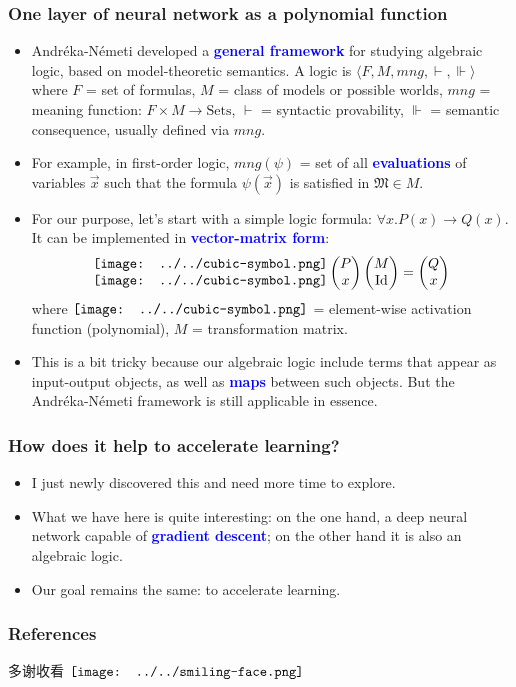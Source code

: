 \documentclass[16pt]{beamer}
\newcommand{\cc}[2]{#1}
\newcommand{\cc}[2]{#2}
\let\oldtextbf\textbf
\renewcommand{\textbf}[1]{\textcolor{blue}{\oldtextbf{#1}}}
\newcommand{\smiley}{$\vcenter{\hbox{\texttt{[image: ../../smiling-face.png]}}}$}
\newcommand{\cubic}{\vcenter{\hbox{\texttt{[image: ../../cubic-symbol.png]}}}}
\begin{document}
\begin{frame}
\frametitle{One layer of neural network as a polynomial function}
\fontsize{10pt}{8}\selectfont
\begin{itemize}
	\item Andr\'{e}ka-N\'{e}meti \cite{Andreka2021} developed a \textbf{general framework} for studying algebraic logic, based on model-theoretic semantics.  A logic is $\langle F, M, mng, \vdash, \Vdash \rangle$ where $F$ = set of formulas, $M$ = class of models or possible worlds, $mng$ = meaning function: $F \times M \rightarrow \mathrm{Sets}$, $\vdash$ = syntactic provability, $\Vdash$ = semantic consequence, usually defined via $mng$.
	
	\item For example, in first-order logic, $mng(\psi)$ = set of all \textbf{evaluations} of variables $\vec{x}$ such that the formula $\psi(\vec{x})$ is satisfied in $\mathfrak{M} \in M$.

	\item For our purpose, let's start with a simple logic formula: $\forall x. P(x) \rightarrow Q(x)$.  It can be implemented in \textbf{vector-matrix form}:
	\begin{gather}
	\begin{matrix} \cubic \\ \cubic \end{matrix}
	\begin{pmatrix} P \\ x \end{pmatrix}
	\begin{pmatrix} M \\ \mathrm{Id} \end{pmatrix}
	= \begin{pmatrix} Q \\ x \end{pmatrix}
	\nonumber
	\end{gather}
	where $\cubic$ = element-wise activation function (polynomial), $M$ = transformation matrix.
	
	\item This is a bit tricky because our algebraic logic include terms that appear as input-output objects, as well as \textbf{maps} between such objects.  But the Andr\'{e}ka-N\'{e}meti framework is still applicable in essence.
\end{itemize}
\end{frame}

\begin{frame}
\frametitle{How does it help to accelerate learning?}
\begin{itemize}
	\item I just newly discovered this and need more time to explore.
	
	\item What we have here is quite interesting: on the one hand, a deep neural network capable of \textbf{gradient descent};  on the other hand it is also an algebraic logic.
	
	\item Our goal remains the same: to accelerate learning.  
\end{itemize}
\end{frame}

\begin{frame}
\frametitle{References}
\cc{多谢收看}{Thanks for watching} \smiley \vspace{1cm}
\printbibliography
\end{frame}
\end{document}
